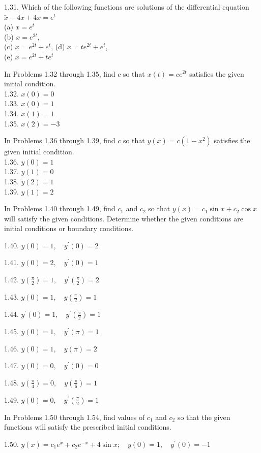 \documentclass[10pt]{article}
\begin{document}
1.31. Which of the following functions are solutions of the differential equation $\ddot{x}-4 \dot{x}+4 x=e^{t}$\\
(a) $x=e^{t}$\\
(b) $x=e^{2 t}$,\\
(c) $x=e^{2 t}+e^{t}$, (d) $x=t e^{2 t}+e^{t}$,\\
(e) $x=e^{2 t}+t e^{t}$

In Problems 1.32 through 1.35, find $c$ so that $x(t)=c e^{2 t}$ satisfies the given initial condition.\\
1.32. $x(0)=0$\\
1.33. $x(0)=1$\\
1.34. $x(1)=1$\\
1.35. $x(2)=-3$

In Problems 1.36 through 1.39, find $c$ so that $y(x)=c\left(1-x^{2}\right)$ satisfies the given initial condition.\\
1.36. $y(0)=1$\\
1.37. $y(1)=0$\\
1.38. $y(2)=1$\\
1.39. $y(1)=2$

In Problems 1.40 through 1.49, find $c_{1}$ and $c_{2}$ so that $y(x)=c_{1} \sin x+c_{2} \cos x$ will satisfy the given conditions. Determine whether the given conditions are initial conditions or boundary conditions.

1.40. $y(0)=1, \quad y^{\prime}(0)=2$

1.41. $y(0)=2, \quad y^{\prime}(0)=1$

1.42. $y\left(\frac{\pi}{2}\right)=1, \quad y^{\prime}\left(\frac{\pi}{2}\right)=2$

1.43. $y(0)=1, \quad y\left(\frac{\pi}{2}\right)=1$

1.44. $y^{\prime}(0)=1, \quad y^{\prime}\left(\frac{\pi}{2}\right)=1$

1.45. $y(0)=1, \quad y^{\prime}(\pi)=1$

1.46. $y(0)=1, \quad y(\pi)=2$

1.47. $y(0)=0, \quad y^{\prime}(0)=0$

1.48. $y\left(\frac{\pi}{4}\right)=0, \quad y\left(\frac{\pi}{6}\right)=1$

1.49. $y(0)=0, \quad y^{\prime}\left(\frac{\pi}{2}\right)=1$

In Problems 1.50 through 1.54, find values of $c_{1}$ and $c_{2}$ so that the given functions will satisfy the prescribed initial conditions.

1.50. $y(x)=c_{1} e^{x}+c_{2} e^{-x}+4 \sin x ; \quad y(0)=1, \quad y^{\prime}(0)=-1$
\end{document}

